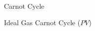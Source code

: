 \documentclass[12pt]{article}
\begin{document}
\vspace{10pt}

\begin{multicols}{2}

  \centering

  \begin{figure}[H]
    \centering
    
    \caption{Carnot Cycle}
    \label{fig:1}
  \end{figure}

  \begin{figure}[H]
    \centering
    
    \caption{Ideal Gas Carnot Cycle ($PV$)}
    \label{fig:2}
  \end{figure}

\end{multicols}
\end{document}
